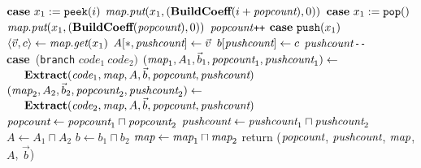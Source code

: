 \begin{algorithm}
\begin{algorithmic}
\UND
\STATE \vspace{-6pt}
\STATE $\mbox{\bf case}~x_1 := \mbox{\tt peek}(i)$
\IND
\STATE $\mbox{\it map}.\mbox{\it put}(x_1, (\mbox{\bf BuildCoeff}(i + \mbox{\it popcount}), 0))$
\UND
\STATE \vspace{-6pt}
\STATE $\mbox{\bf case}~x_1 := \mbox{\tt pop}()$
\IND
\STATE $\mbox{\it map}.\mbox{\it put}(x_1, (\mbox{\bf BuildCoeff}(\mbox{\it popcount}), 0))$
\STATE $\mbox{\it popcount}$\verb|++|
\UND
\STATE \vspace{-6pt}
\STATE $\mbox{\bf case}~\mbox{\tt push}(x_1)$
\IND
\STATE $\langle{\vec v}, {c}\rangle \leftarrow \mbox{\it map}.\mbox{\it get}(x_1)$
\STATE $A[*, \mbox{\it pushcount}] \leftarrow \vec v$
\STATE $b[\mbox{\it pushcount}] \leftarrow c$
\STATE $\mbox{\it pushcount}$\verb|--|
\UND
\STATE \vspace{-6pt}
\STATE \mbox{\bf case}~({\tt branch} $code_1~code_2)$
\IND
\STATE $(\mbox{\it map}_1, A_1, {\vec b_1}, \mbox{\it popcount}_1, \mbox{\it pushcount}_1) \leftarrow$ \\
\verb+   +${\mbox{\bf Extract}}(\mbox{\it code}_1, \mbox{\it map}, A, {\vec b}, \mbox{\it popcount}, \mbox{\it pushcount})$
\STATE $(\mbox{\it map}_2, A_2, {\vec b_2}, \mbox{\it popcount}_2, \mbox{\it pushcount}_2) \leftarrow$ \\ 
\verb+   +${\mbox{\bf Extract}}(\mbox{\it code}_2, \mbox{\it map}, A, {\vec b}, \mbox{\it popcount}, \mbox{\it pushcount})$
\STATE $\mbox{\it popcount} \leftarrow \mbox{\it popcount}_1 \sqcap \mbox{\it popcount}_2$
\STATE $\mbox{\it pushcount} \leftarrow \mbox{\it pushcount}_1 \sqcap \mbox{\it pushcount}_2$
\STATE $A \leftarrow A_1 \sqcap A_2$
\STATE $b \leftarrow b_1 \sqcap b_2$
\STATE $\mbox{\it map} \leftarrow \mbox{\it map}_1 \sqcap \mbox{\it map}_2$
\UND
\UND %
\ENDFOR
\STATE return ($\mbox{\it popcount}$, $\mbox{\it pushcount}$, $\mbox{\it map}$, $A$, ${\vec b}$)
\end{algorithmic}
\end{algorithm}

\clearpage